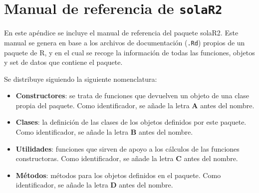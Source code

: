\chapter{Manual de referencia de \texttt{solaR2}}
\label{chap:manual}
En este apéndice se incluye el manual de referencia del paquete solaR2. Este manual se genera en base a los archivos de documentación (\texttt{.Rd}) propios de un paquete de R, y en el cual se recoge la información de todas las funciones, objetos y set de datos que contiene el paquete.

Se distribuye siguiendo la siguiente nomenclatura:
\begin{itemize}
\item \textbf{Constructores}: se trata de funciones que devuelven un objeto de una clase propia del paquete. Como identificador, se añade la letra \textbf{A} antes del nombre.
\item \textbf{Clases}: la definición de las clases de los objetos definidos por este paquete. Como identificador, se añade la letra \textbf{B} antes del nombre.
\item \textbf{Utilidades}: funciones que sirven de apoyo a los cálculos de las funciones constructoras. Como identificador, se añade la letra \textbf{C} antes del nombre.
\item \textbf{Métodos}: métodos para los objetos definidos en el paquete. Como identificador, se añade la letra \textbf{D} antes del nombre.
\end{itemize}

